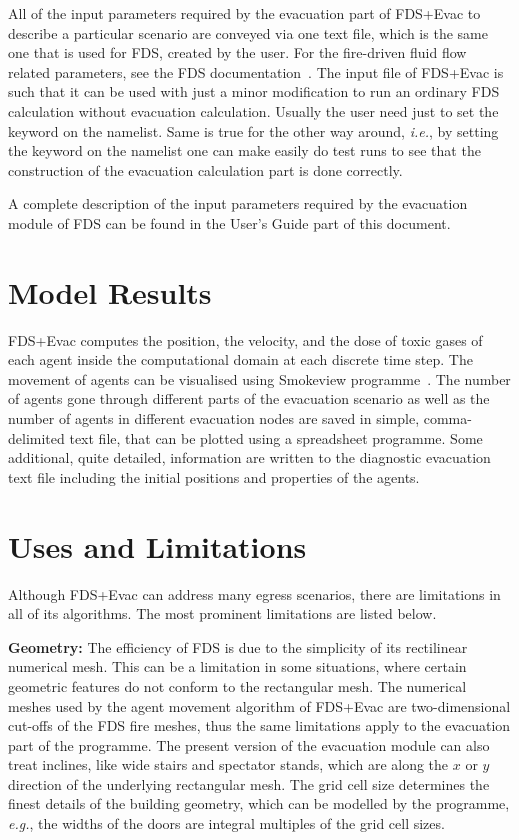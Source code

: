 \documentclass[12pt,a4paper,final,twoside]{stylevk}
\begin{document}
\noindent All of the input parameters required by the evacuation part
of FDS+Evac to describe a particular scenario are conveyed via one
text file, which is the same one that is used for FDS, created by the
user.  For the fire-driven fluid flow related parameters, see the FDS
documentation~\cite{FDS_UserGuide}.  The input file of FDS+Evac is
such that it can be used with just a minor modification to run an
ordinary FDS calculation without evacuation calculation.  Usually the
user need just to set the keyword  on the
 namelist.  Same is true for the other way around,
\emph{i.e.}, by setting the keyword 
on the  namelist one can make easily do test runs to see
that the construction of the evacuation calculation part is done
correctly.


A complete description of the input parameters required by the
evacuation module of FDS can be found in the User's Guide part of this
document.


\section{Model Results}

\noindent FDS+Evac computes the position, the velocity, and the dose
of toxic gases of each agent inside the computational domain at each
discrete time step.  The movement of agents can be visualised using
Smokeview programme~\cite{SV_UserGuide}.  The number of agents gone
through different parts of the evacuation scenario as well as the
number of agents in different evacuation nodes are saved in simple,
comma-delimited text file, that can be plotted using a spreadsheet
programme.  Some additional, quite detailed, information are written
to the diagnostic evacuation text file including the initial positions
and properties of the agents.


\section{Uses and Limitations}\label{Sec_UsesAndLimit}

\noindent Although FDS+Evac can address many egress scenarios, there
are limitations in all of its algorithms.  The most prominent
limitations are listed below.


\textbf{Geometry:} The efficiency of FDS is due to the simplicity
of its rectilinear numerical mesh.  This can be a limitation in some
situations, where certain geometric features do not conform to the
rectangular mesh.  The numerical meshes used by the agent movement
algorithm of FDS+Evac are two-dimensional cut-offs of the FDS fire
meshes, thus the same limitations apply to the evacuation part of the
programme.  The present version of the evacuation module can also
treat inclines, like wide stairs and spectator stands, which are along
the $x$ or $y$ direction of the underlying rectangular mesh.  The grid
cell size determines the finest details of the building geometry,
which can be modelled by the programme, \emph{e.g.}, the widths of the
doors are integral multiples of the grid cell sizes.
\end{document}
